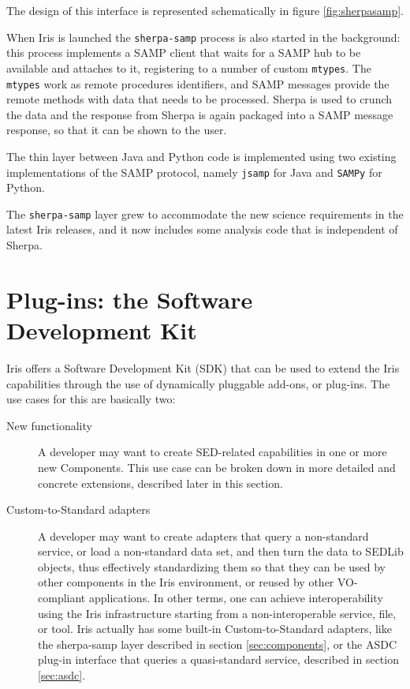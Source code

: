 \documentclass[5p]{elsarticle}
\begin{document}
The design of this interface is represented schematically in figure \ref{fig:sherpasamp}.

When Iris is launched the \verb|sherpa-samp| process is also started in the background: this process implements a SAMP client that waits for a SAMP hub to be available and attaches to it, registering to a number of custom \verb|mtypes|. The \verb|mtypes| work as remote procedures identifiers, and SAMP messages provide the remote methods with data that needs to be processed. Sherpa is used to crunch the data and the response from Sherpa is again packaged into a SAMP message response, so that it can be shown to the user.

The thin layer between Java and Python code is implemented using two existing implementations of the SAMP protocol, namely \verb|jsamp| for Java and \verb|SAMPy| for Python.

The \verb|sherpa-samp| layer grew to accommodate the new science requirements in the latest Iris releases, and it now includes some analysis code that is independent of Sherpa.

\section{Plug-ins: the Software Development Kit}
\label{sec:plugins}

Iris offers a Software Development Kit (SDK) that can be used to extend the Iris capabilities through the use of dynamically pluggable add-ons, or plug-ins.
The use cases for this are basically two:
\begin{description}
\item[New functionality] A developer may want to create SED-related capabilities in one or more new Components. This use case can be broken down in more detailed and concrete extensions, described later in this section.
\item[Custom-to-Standard adapters] A developer may want to create adapters that query a non-standard service, or load a non-standard data set, and then turn the data to SEDLib objects, thus effectively standardizing them so that they can be used by other components in the Iris environment, or reused by other VO-compliant applications. In other terms, one can achieve interoperability using the Iris infrastructure starting from a non-interoperable service, file, or tool. Iris actually has some built-in Custom-to-Standard adapters, like the sherpa-samp layer described in section \ref{sec:components}, or the ASDC plug-in interface that queries a quasi-standard service, described in section \ref{sec:asdc}.
\end{description}
\end{document}
